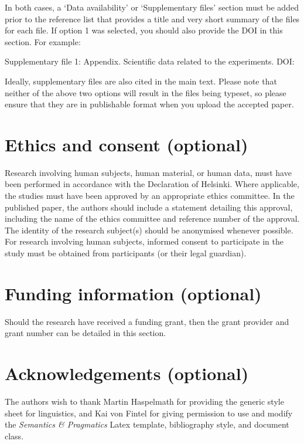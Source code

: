 \documentclass[charis,linguex]{glossa}
\begin{document}
\noindent In both cases, a `Data availability' or `Supplementary files' section must be added prior to the reference list that provides a title and very short summary of the files for each file. If option 1 was selected, you should also provide the DOI in this section. For example:

\noindent Supplementary file 1: Appendix. Scientific data related to the experiments. DOI: 

Ideally, supplementary files are also cited in the main text. Please note that neither of the above two options will result in the files being typeset, so please ensure that they are in publishable format when you upload the accepted paper.


\section*{Ethics and consent (optional)}

Research involving human subjects, human material, or human data, must have been performed in accordance with the Declaration of Helsinki. Where applicable, the studies must have been approved by an appropriate ethics committee. In the published paper, the authors should include a statement detailing this approval, including the name of the ethics committee and reference number of the approval. The identity of the research subject(s) should be anonymised whenever possible. For research involving human subjects, informed consent to participate in the study must be obtained from participants (or their legal guardian).


\section*{Funding information (optional)}

Should the research have received a funding grant, then the grant provider and grant number can be detailed in this section. 

\section*{Acknowledgements (optional)}

The authors wish to thank Martin Haspelmath for providing the generic style sheet for linguistics, and Kai von Fintel for giving permission to use and modify the \textit{Semantics \& Pragmatics} Latex template, bibliography style, and document class.
\end{document}

